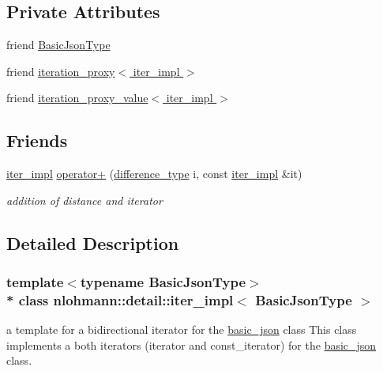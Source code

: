 \subsection*{Private Attributes}
\begin{DoxyCompactItemize}
\item 
friend \hyperlink{classnlohmann_1_1detail_1_1iter__impl_abf18f18793f84b0222aebb5a2a87da7a}{Basic\+Json\+Type}
\item 
friend \hyperlink{classnlohmann_1_1detail_1_1iter__impl_a28328d17a18d9754c89c5c8159677a6f}{iteration\+\_\+proxy$<$ iter\+\_\+impl $>$}
\item 
friend \hyperlink{classnlohmann_1_1detail_1_1iter__impl_ac501dc2374b4d17a884fc9a656e80d5a}{iteration\+\_\+proxy\+\_\+value$<$ iter\+\_\+impl $>$}
\end{DoxyCompactItemize}
\subsection*{Friends}
\begin{DoxyCompactItemize}
\item 
\hyperlink{classnlohmann_1_1detail_1_1iter__impl}{iter\+\_\+impl} \hyperlink{classnlohmann_1_1detail_1_1iter__impl_a94108d1a7563e103534f23eb5c1ee175}{operator+} (\hyperlink{classnlohmann_1_1detail_1_1iter__impl_a2f7ea9f7022850809c60fc3263775840}{difference\+\_\+type} i, const \hyperlink{classnlohmann_1_1detail_1_1iter__impl}{iter\+\_\+impl} \&it)
\begin{DoxyCompactList}\small\item\em addition of distance and iterator \end{DoxyCompactList}\end{DoxyCompactItemize}


\subsection{Detailed Description}
\subsubsection*{template$<$typename Basic\+Json\+Type$>$\\*
class nlohmann\+::detail\+::iter\+\_\+impl$<$ Basic\+Json\+Type $>$}

a template for a bidirectional iterator for the \hyperlink{classnlohmann_1_1basic__json}{basic\+\_\+json} class This class implements a both iterators (iterator and const\+\_\+iterator) for the \hyperlink{classnlohmann_1_1basic__json}{basic\+\_\+json} class. 

